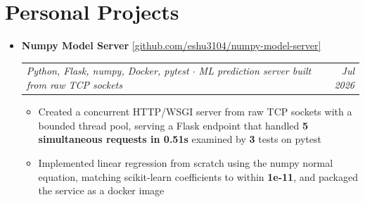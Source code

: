 \documentclass[10pt,letterpaper]{article}
\makeatletter
\newcommand{\resumeProjectHeading}[5]{%
  \vspace{5pt}%
  \item[]%
    {\small \textbf{#1} \enspace \href{#5}{\textcolor{accentblue}{[\underline{#2}]}}}\\[2pt]%
    {\small \begin{tabular*}{0.99\textwidth}{l@{\extracolsep{\fill}}r}%
      \textcolor{midgray}{\textit{\hspace{2pt}#3}} & \textcolor{midgray}{\textit{#4}}%
    \end{tabular*}}%
  \vspace{3pt}%
}
\newcommand{\resumeItem}[1]{
  \item {\small #1}
}
\makeatother
\begin{document}
\section{Personal Projects}
\begin{itemize}[leftmargin=0in, label={}]

  \resumeProjectHeading
    {Numpy Model Server}{github.com/eshu3104/numpy-model-server}
    {Python, Flask, numpy, Docker, pytest \enspace $\cdot$ \enspace ML prediction server built from raw TCP sockets}
    {Jul 2026}
    {https://github.com/eshu3104/numpy-model-server}
  \begin{itemize}
    \resumeItem{Created a concurrent HTTP/WSGI server from raw TCP sockets with a bounded thread pool, serving a Flask endpoint that handled \textbf{5 simultaneous requests in 0.51s} examined by \textbf{3} tests on pytest}
    \resumeItem{Implemented linear regression from scratch using the numpy normal equation, matching scikit-learn coefficients to within \textbf{1e-11}, and packaged the service as a docker image}
  \end{itemize}


\end{itemize}
\end{document}
